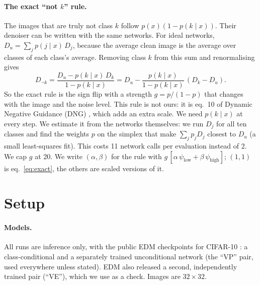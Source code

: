\documentclass[11pt]{article}
\newcommand{\low}{\psi_{\mathrm{low}}}
\newcommand{\high}{\psi_{\mathrm{high}}}
\begin{document}
\paragraph{The exact ``not $k$'' rule.} The images that are truly not class $k$ follow $p(x)(1 - p(k\mid x))$. Their
denoiser can be written with the same networks. For ideal networks, $D_u = \sum_j p(j\mid x)\, D_j$, because the
average clean image is the average over classes of each class's average. Removing class $k$ from this sum and
renormalising gives
\begin{equation}
  D_{\neg k} = \frac{D_u - p(k\mid x)\, D_k}{1 - p(k\mid x)} = D_u - \frac{p(k\mid x)}{1 - p(k\mid x)}\,(D_k - D_u).
  \label{eq:exact}
\end{equation}
So the exact rule is the sign flip with a strength $g = p/(1-p)$ that changes with the image and the noise level. This
rule is not ours: it is eq.~10 of Dynamic Negative Guidance (DNG) \cite{dng}, which adds an extra scale. We need
$p(k\mid x)$ at every step. We estimate it from the networks themselves: we run $D_j$ for all ten classes and find the
weights $p$ on the simplex that make $\sum_j p_j D_j$ closest to $D_u$ (a small least-squares fit). This costs 11
network calls per evaluation instead of 2. We cap $g$ at 20. We write $(\alpha, \beta)$ for the rule with
$g\,[\alpha\,\low + \beta\,\high]$; $(1,1)$ is eq.~\eqref{eq:exact}, the others are scaled versions of it.

\section{Setup}
\label{sec:setup}

\paragraph{Models.} All runs are inference only, with the public EDM checkpoints for CIFAR-10 \cite{edm}: a
class-conditional and a separately trained unconditional network (the ``VP'' pair, used everywhere unless stated). EDM
also released a second, independently trained pair (``VE''), which we use as a check. Images are $32\times32$.
\end{document}
